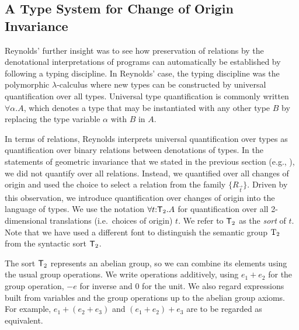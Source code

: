 
\subsection{A Type System for Change of Origin Invariance}
\label{sec:type-system-geom-intro}

Reynolds' further insight was to see how preservation of relations by
the denotational interpretations of programs can automatically be
established by following a typing discipline. In Reynolds' case, the
typing discipline was the polymorphic $\lambda$-calculus where new
types can be constructed by universal quantification over all
types. Universal type quantification is commonly written $\forall
\alpha. A$, which denotes a type that may be instantiated with any
other type $B$ by replacing the type variable $\alpha$ with $B$ in
$A$.

In terms of relations, Reynolds interprets universal quantification
over types as quantification over binary relations between denotations
of types. In the statements of geometric invariance that we stated in
the previous section (e.g., ), we
did not quantify over all relations. Instead, we quantified over all
changes of origin and used the choice to select a relation from the
family $\{R_{\vec{t}}\}$. Driven by this observation, we introduce
quantification over changes of origin into the language of types.  We
use the notation $\forall t \mathord: \mathsf{T}_2. A$ for
quantification over all 2-dimensional translations (i.e.~choices of
origin) $t$. We refer to $\mathsf{T}_2$ as the \emph{sort} of
$t$. Note that we have used a different font to distinguish the
semantic group $\mathrm{T}_2$ from the syntactic sort $\mathsf{T}_2$.

The sort $\mathsf{T}_2$ represents an abelian group, so we can combine
its elements using the usual group operations. We write operations
additively, using $e_1 + e_2$ for the group operation, $-e$ for
inverse and $0$ for the unit.  We also regard expressions built from
variables and the group operations up to the abelian group axioms. For
example, $e_1 + (e_2 + e_3)$ and $(e_1 + e_2) + e_3$ are to be
regarded as equivalent.

